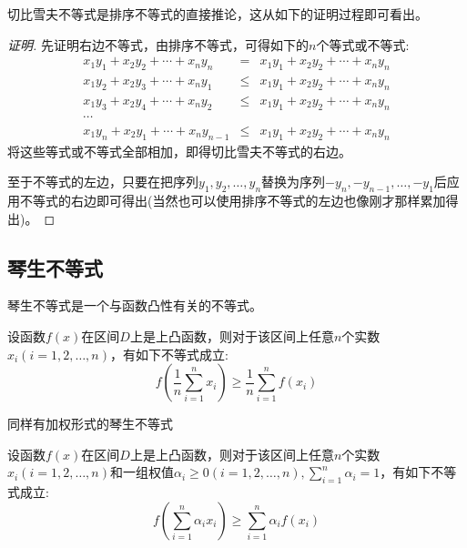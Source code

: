 切比雪夫不等式是排序不等式的直接推论，这从如下的证明过程即可看出。

\begin{proof}[证明]
  先证明右边不等式，由排序不等式，可得如下的$n$个等式或不等式:
  \begin{eqnarray*}
    x_1y_1+x_2y_2+\cdots+x_ny_n &=& x_1y_1+x_2y_2+\cdots+x_ny_n \\
    x_1y_2+x_2y_3+\cdots+x_ny_1 & \leqslant & x_1y_1+x_2y_2+\cdots+x_ny_n \\
    x_1y_3+x_2y_4+\cdots+x_ny_2 & \leqslant & x_1y_1+x_2y_2+\cdots+x_ny_n \\
    \cdots & & \\
    x_1y_n+x_2y_1+\cdots+x_ny_{n-1} & \leqslant & x_1y_1+x_2y_2+\cdots+x_ny_n 
  \end{eqnarray*}
  将这些等式或不等式全部相加，即得切比雪夫不等式的右边。

  至于不等式的左边，只要在把序列$y_1,y_2,\ldots,y_n$替换为序列$-y_n,-y_{n-1},\ldots,-y_1$后应用不等式的右边即可得出(当然也可以使用排序不等式的左边也像刚才那样累加得出)。
\end{proof}

\subsection{琴生不等式}
\label{sec:jenson-inequality}

琴生不等式是一个与函数凸性有关的不等式。
\begin{theorem}[琴生不等式]
  设函数$f(x)$在区间$D$上是上凸函数，则对于该区间上任意$n$个实数$x_i(i=1,2,\ldots,n)$，有如下不等式成立:
  \begin{equation}
    \label{eq:jenson-inequality-some-import-inequality}
    f \left( \frac{1}{n} \sum_{i=1}^nx_i \right) \geqslant
    \frac{1}{n} \sum_{i=1}^n f(x_i)
  \end{equation}
\end{theorem}

同样有加权形式的琴生不等式
\begin{theorem}[加权形式的琴生不等式]
  设函数$f(x)$在区间$D$上是上凸函数，则对于该区间上任意$n$个实数$x_i(i=1,2,\ldots,n)$和一组权值$\alpha_i\geqslant 0(i=1,2,\ldots,n), \sum_{i=1}^n\alpha_i=1$，有如下不等式成立:
  \begin{equation}
    \label{eq:jenson-inequality-some-import-inequality}
    f \left( \sum_{i=1}^n\alpha_ix_i \right) \geqslant
    \sum_{i=1}^n \alpha_if(x_i)
  \end{equation}
\end{theorem}

